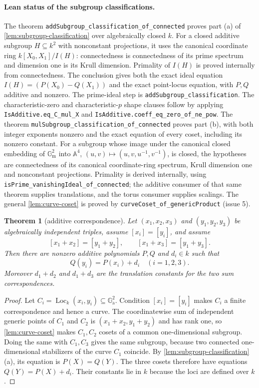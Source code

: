 \documentclass[11pt,oneside]{article}
\newtheorem{theorem}{Theorem}[section]
\theoremstyle{definition}
\theoremstyle{remark}
\newcommand{\Ga}{\mathbb G_{\mathrm a}}
\newcommand{\Gm}{\mathbb G_{\mathrm m}}
\newcommand{\Loc}{\operatorname{Loc}}
\newcommand{\lean}[1]{\nolinkurl{#1}}
\begin{document}
\paragraph{Lean status of the subgroup classifications.}
The theorem \lean{addSubgroup_classification_of_connected} proves part (a) of
\cref{lem:subgroup-classification} over algebraically closed $k$. For a closed additive
subgroup $H\subseteq k^2$ with nonconstant projections, it uses the canonical coordinate ring
$k[X_0,X_1]/I(H)$: connectedness is connectedness of its prime spectrum and dimension one
is its Krull dimension. Primality of $I(H)$ is proved internally from connectedness.
The conclusion gives both the exact ideal equation $I(H)=(P(X_0)-Q(X_1))$ and the exact
point-locus equation, with $P,Q$ additive and nonzero.
The prime-ideal step is \lean{addSubgroup_classification}. The characteristic-zero and
characteristic-$p$ shape clauses follow by applying \lean{IsAdditive.eq_C_mul_X} and
\lean{IsAdditive.coeff_eq_zero_of_ne_pow}.
The theorem \lean{mulSubgroup_classification_of_connected} proves part (b), with both
integer exponents nonzero and the exact equation of every coset, including its nonzero
constant. For a subgroup whose image under the canonical closed embedding of $\Gm^2$ into
$\mathbb A^4$, $(u,v)\mapsto(u,v,u^{-1},v^{-1})$, is closed, the hypotheses are connectedness
of its canonical coordinate-ring spectrum, Krull dimension one and nonconstant projections.
Primality is derived internally, using
\lean{isPrime_vanishingIdeal_of_connected}; the additive consumer of that same theorem
supplies translations, and the torus consumer supplies scalings. The general
\cref{lem:curve-coset} is proved by \lean{curveCoset_of_genericProduct} (issue 5).

\begin{theorem}[additive correspondence]\label{thm:addcorr}
Let $(x_1,x_2,x_3)$ and $(y_1,y_2,y_3)$ be algebraically independent triples, assume
$[x_i]=[y_i]$, and assume
\[
 [x_1+x_2]=[y_1+y_2],\qquad [x_1+x_3]=[y_1+y_3].
\]
Then there are nonzero additive polynomials $P,Q$ and $d_i\in k$ such that
\[
 Q(y_i)=P(x_i)+d_i\quad(i=1,2,3).
\]
Moreover $d_1+d_2$ and $d_1+d_3$ are the translation constants for the two sum
correspondences.
\end{theorem}
\begin{proof}
Let $C_i=\Loc_k(x_i,y_i)\subseteq\Ga^2$.  Condition $[x_i]=[y_i]$ makes $C_i$ a finite
correspondence and hence a curve.  The coordinatewise sum of independent generic points
of $C_1$ and $C_2$ is $(x_1+x_2,y_1+y_2)$ and has rank one, so
\cref{lem:curve-coset} makes $C_1,C_2$ cosets of a common one-dimensional subgroup.
Doing the same with $C_1,C_3$ gives the same subgroup, because two connected
one-dimensional stabilizers of the curve $C_1$ coincide.  By
\cref{lem:subgroup-classification}(a), its equation is $P(X)=Q(Y)$.  The three cosets
therefore have equations $Q(Y)=P(X)+d_i$.  Their constants lie in $k$ because the loci
are defined over $k$.
\end{proof}
\end{document}
